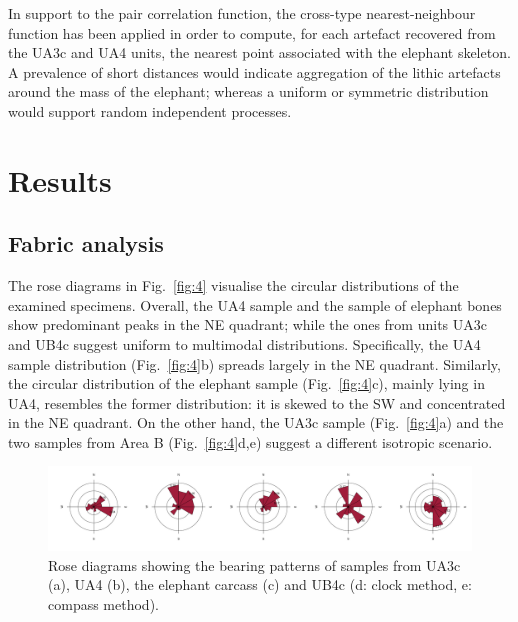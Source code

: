 \documentclass[preprint,authoryear,times]{elsarticle} %
\begin{document}
In support to the pair correlation function, the cross-type nearest-neighbour function has been applied in order to compute, for each artefact recovered from the UA3c and UA4 units, the nearest point associated with the elephant skeleton. A prevalence of short distances would indicate aggregation of the lithic artefacts around the mass of the elephant; whereas a uniform or symmetric distribution would support random independent processes.

\section{Results}

\subsection{Fabric analysis}


The rose diagrams in Fig.~\ref{fig:4} visualise the circular distributions of the examined specimens. Overall, the UA4 sample and the sample of elephant bones show predominant peaks in the NE quadrant; while the ones from units UA3c and UB4c suggest uniform to multimodal distributions. Specifically, the UA4 sample distribution (Fig.~\ref{fig:4}b) spreads largely in the NE quadrant. Similarly, the circular distribution of the elephant sample (Fig.~\ref{fig:4}c), mainly lying in UA4, resembles the former distribution: it is skewed to the SW and concentrated in the NE quadrant. On the other hand, the UA3c sample (Fig.~\ref{fig:4}a) and the two samples from Area B (Fig.~\ref{fig:4}d,e) suggest a different isotropic scenario.

\begin{figure}[]
  \centering
  \includegraphics[width=1\textwidth]{../artwork/Fig5.pdf}
  \caption{Rose diagrams showing the bearing patterns of samples from UA3c (a), UA4 (b), the elephant carcass (c) and UB4c (d: clock method, e: compass method).}
  \label{fig:5}
\end{figure}
\end{document}
